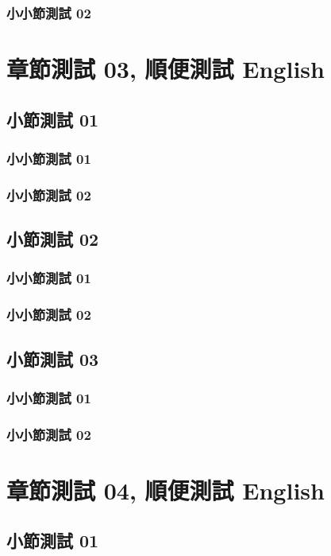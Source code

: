     \subsection{小小節測試 02}
    \lipsum[23]

\chapter{章節測試 03, 順便測試 English}
    \section{小節測試 01}
    \lipsum[23]
    \subsection{小小節測試 01}
    \lipsum[23]
    \subsection{小小節測試 02}
    \lipsum[23]
    \section{小節測試 02}
    \lipsum[23]
    \subsection{小小節測試 01}
    \lipsum[23]
    \subsection{小小節測試 02}
    \lipsum[23]
    \section{小節測試 03}
    \lipsum[23]
    \subsection{小小節測試 01}
    \lipsum[23]
    \subsection{小小節測試 02}
    \lipsum[23]

\chapter{章節測試 04, 順便測試 English}
    \section{小節測試 01}
    \lipsum[23]
